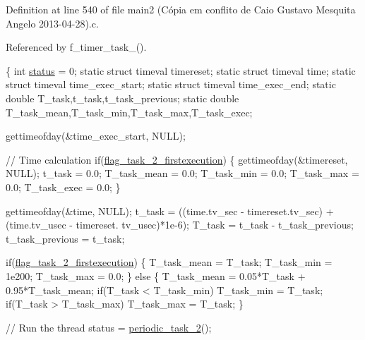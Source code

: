 Definition at line 540 of file main2 (\-Cópia em conflito de Caio Gustavo Mesquita Angelo 2013-\/04-\/28).\-c.



Referenced by f\-\_\-timer\-\_\-task\-\_().


\begin{DoxyCode}
\{
    \textcolor{keywordtype}{int} \hyperlink{communication_01_07C_xC3_xB3pia_01em_01conflito_01de_01Andr_xC3_xA9_01Carvalho_012013-04-26_08_8c_a6e27f49150e9a14580fb313cc2777e00}{status} = 0;
    \textcolor{keyword}{static} \textcolor{keyword}{struct }timeval timereset;
    \textcolor{keyword}{static} \textcolor{keyword}{struct }timeval time;
    \textcolor{keyword}{static} \textcolor{keyword}{struct }timeval time\_exec\_start;
    \textcolor{keyword}{static} \textcolor{keyword}{struct }timeval time\_exec\_end;
    \textcolor{keyword}{static} \textcolor{keywordtype}{double} T\_task,t\_task,t\_task\_previous;
    \textcolor{keyword}{static} \textcolor{keywordtype}{double} T\_task\_mean,T\_task\_min,T\_task\_max,T\_task\_exec;

    gettimeofday(&time\_exec\_start, NULL);

    \textcolor{comment}{// Time calculation}
    \textcolor{keywordflow}{if}(\hyperlink{main2_01_07C_xC3_xB3pia_01em_01conflito_01de_01Caio_01Gustavo_01Mesquita_01Angelo_012013-04-28_08_8c_a60e039269ae4a130db1bdbc4a709c437}{flag\_task\_2\_firstexecution})
    \{
        gettimeofday(&timereset, NULL);
        t\_task = 0.0;
        T\_task\_mean = 0.0;
        T\_task\_min = 0.0;
        T\_task\_max = 0.0;
        T\_task\_exec = 0.0;
    \}

    gettimeofday(&time, NULL);
    t\_task = ((time.tv\_sec - timereset.tv\_sec) + (time.tv\_usec - timereset.
      tv\_usec)*1e-6);
    T\_task = t\_task - t\_task\_previous;
    t\_task\_previous = t\_task;

    \textcolor{keywordflow}{if}(\hyperlink{main2_01_07C_xC3_xB3pia_01em_01conflito_01de_01Caio_01Gustavo_01Mesquita_01Angelo_012013-04-28_08_8c_a60e039269ae4a130db1bdbc4a709c437}{flag\_task\_2\_firstexecution})
    \{
        T\_task\_mean = T\_task;
        T\_task\_min  = 1e200;
        T\_task\_max  = 0.0;
    \}
    \textcolor{keywordflow}{else}
    \{
        T\_task\_mean = 0.05*T\_task + 0.95*T\_task\_mean;
        \textcolor{keywordflow}{if}(T\_task < T\_task\_min) T\_task\_min  = T\_task;
        \textcolor{keywordflow}{if}(T\_task > T\_task\_max) T\_task\_max  = T\_task;
    \}

    \textcolor{comment}{// Run the thread}
    status = \hyperlink{main2_01_07C_xC3_xB3pia_01em_01conflito_01de_01Caio_01Gustavo_01Mesquita_01Angelo_012013-04-28_08_8c_a944f7352f18ed248c1b1143f51edc391}{periodic\_task\_2}();


\end{DoxyCode}
